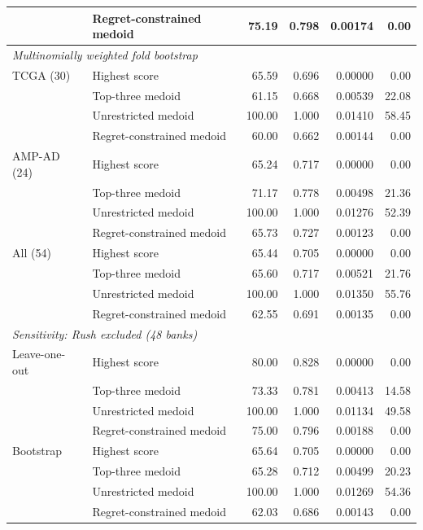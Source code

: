 \begin{table}[p]
\begin{tabular}{llrrrr}
 & Regret-constrained medoid & 75.19 & 0.798 & 0.00174 & 0.00 \\
\hline
\multicolumn{6}{l}{\textit{Multinomially weighted fold bootstrap}} \\
TCGA (30) & Highest score & 65.59 & 0.696 & 0.00000 & 0.00 \\
 & Top-three medoid & 61.15 & 0.668 & 0.00539 & 22.08 \\
 & Unrestricted medoid & 100.00 & 1.000 & 0.01410 & 58.45 \\
 & Regret-constrained medoid & 60.00 & 0.662 & 0.00144 & 0.00 \\
AMP-AD (24) & Highest score & 65.24 & 0.717 & 0.00000 & 0.00 \\
 & Top-three medoid & 71.17 & 0.778 & 0.00498 & 21.36 \\
 & Unrestricted medoid & 100.00 & 1.000 & 0.01276 & 52.39 \\
 & Regret-constrained medoid & 65.73 & 0.727 & 0.00123 & 0.00 \\
All (54) & Highest score & 65.44 & 0.705 & 0.00000 & 0.00 \\
 & Top-three medoid & 65.60 & 0.717 & 0.00521 & 21.76 \\
 & Unrestricted medoid & 100.00 & 1.000 & 0.01350 & 55.76 \\
 & Regret-constrained medoid & 62.55 & 0.691 & 0.00135 & 0.00 \\
\hline
\multicolumn{6}{l}{\textit{Sensitivity: Rush excluded (48 banks)}} \\
Leave-one-out & Highest score & 80.00 & 0.828 & 0.00000 & 0.00 \\
 & Top-three medoid & 73.33 & 0.781 & 0.00413 & 14.58 \\
 & Unrestricted medoid & 100.00 & 1.000 & 0.01134 & 49.58 \\
 & Regret-constrained medoid & 75.00 & 0.796 & 0.00188 & 0.00 \\
Bootstrap & Highest score & 65.64 & 0.705 & 0.00000 & 0.00 \\
 & Top-three medoid & 65.28 & 0.712 & 0.00499 & 20.23 \\
 & Unrestricted medoid & 100.00 & 1.000 & 0.01269 & 54.36 \\
 & Regret-constrained medoid & 62.03 & 0.686 & 0.00143 & 0.00 \\
\hline
\end{tabular}
\end{table}
